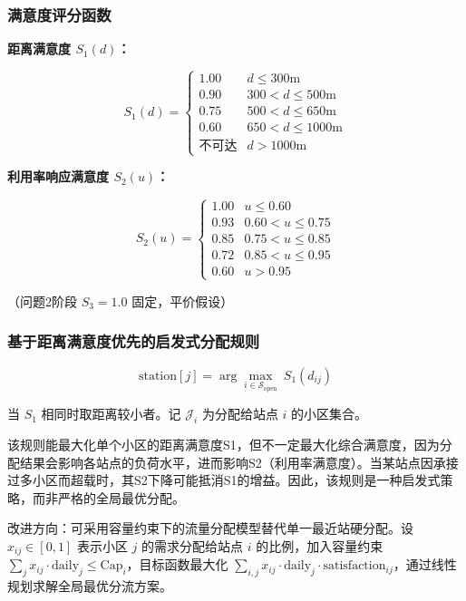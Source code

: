 \documentclass[UTF8]{ctexart}
\begin{document}
\subsubsection{满意度评分函数}

\textbf{距离满意度 $S_1(d)$：}

\begin{equation}
S_1(d) = \begin{cases} 1.00 & d \leq 300\text{m} \\ 0.90 & 300 < d \leq 500\text{m} \\ 0.75 & 500 < d \leq 650\text{m} \\ 0.60 & 650 < d \leq 1000\text{m} \\ \text{不可达} & d > 1000\text{m} \end{cases} \tag{2.4}
\end{equation}

\textbf{利用率响应满意度 $S_2(u)$：}

\begin{equation}
S_2(u) = \begin{cases} 1.00 & u \leq 0.60 \\ 0.93 & 0.60 < u \leq 0.75 \\ 0.85 & 0.75 < u \leq 0.85 \\ 0.72 & 0.85 < u \leq 0.95 \\ 0.60 & u > 0.95 \end{cases} \tag{2.5}
\end{equation}

（问题2阶段 $S_3 = 1.0$ 固定，平价假设）

\subsubsection{基于距离满意度优先的启发式分配规则}

\begin{equation}
\text{station}[j] = \arg\max_{i\in\mathcal{S}_{\text{open}}}\ S_1(d_{ij}) \tag{2.6}
\end{equation}

当 $S_1$ 相同时取距离较小者。记 $\mathcal{J}_i$ 为分配给站点 $i$ 的小区集合。

该规则能最大化单个小区的距离满意度S1，但不一定最大化综合满意度，因为分配结果会影响各站点的负荷水平，进而影响S2（利用率满意度）。当某站点因承接过多小区而超载时，其S2下降可能抵消S1的增益。因此，该规则是一种启发式策略，而非严格的全局最优分配。

改进方向：可采用容量约束下的流量分配模型替代单一最近站硬分配。设 $x_{ij}\in[0,1]$ 表示小区 $j$ 的需求分配给站点 $i$ 的比例，加入容量约束 $\sum_j x_{ij}\cdot\text{daily}_j \leq \text{Cap}_i$，目标函数最大化 $\sum_{i,j} x_{ij}\cdot\text{daily}_j\cdot\text{satisfaction}_{ij}$，通过线性规划求解全局最优分流方案。
\end{document}

